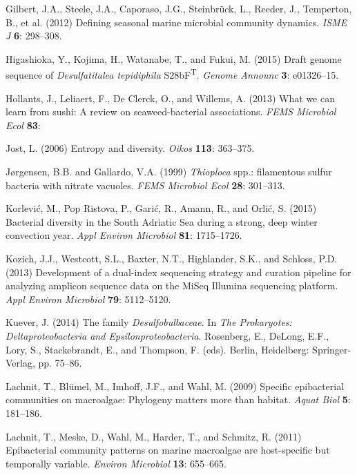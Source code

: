 \documentclass[12pt,]{article}
\begin{document}
\leavevmode\hypertarget{ref-Gilbert2012}{}%
Gilbert, J.A., Steele, J.A., Caporaso, J.G., Steinbrück, L., Reeder, J.,
Temperton, B., et al. (2012) Defining seasonal marine microbial
community dynamics. \emph{ISME J} \textbf{6}: 298--308.

\leavevmode\hypertarget{ref-Higashioka2015}{}%
Higashioka, Y., Kojima, H., Watanabe, T., and Fukui, M. (2015) Draft
genome sequence of \emph{Desulfatitalea tepidiphila}
S28bF\textsuperscript{T}. \emph{Genome Announc} \textbf{3}: e01326--15.

\leavevmode\hypertarget{ref-Hollants2013}{}%
Hollants, J., Leliaert, F., De Clerck, O., and Willems, A. (2013) What
we can learn from sushi: A review on seaweed-bacterial associations.
\emph{FEMS Microbiol Ecol} \textbf{83}:

\leavevmode\hypertarget{ref-Jost2006}{}%
Jost, L. (2006) Entropy and diversity. \emph{Oikos} \textbf{113}:
363--375.

\leavevmode\hypertarget{ref-Jorgensen1999}{}%
Jørgensen, B.B. and Gallardo, V.A. (1999) \emph{Thioploca} spp.:
filamentous sulfur bacteria with nitrate vacuoles. \emph{FEMS Microbiol
Ecol} \textbf{28}: 301--313.

\leavevmode\hypertarget{ref-Korlevic2015}{}%
Korlević, M., Pop Ristova, P., Garić, R., Amann, R., and Orlić, S.
(2015) Bacterial diversity in the South Adriatic Sea during a strong,
deep winter convection year. \emph{Appl Environ Microbiol} \textbf{81}:
1715--1726.

\leavevmode\hypertarget{ref-Kozich2013}{}%
Kozich, J.J., Westcott, S.L., Baxter, N.T., Highlander, S.K., and
Schloss, P.D. (2013) Development of a dual-index sequencing strategy and
curation pipeline for analyzing amplicon sequence data on the MiSeq
Illumina sequencing platform. \emph{Appl Environ Microbiol} \textbf{79}:
5112--5120.

\leavevmode\hypertarget{ref-Kuever2014}{}%
Kuever, J. (2014) The family \emph{Desulfobulbaceae}. In \emph{The
Prokaryotes: Deltaproteobacteria and Epsilonproteobacteria}. Rosenberg,
E., DeLong, E.F., Lory, S., Stackebrandt, E., and Thompson, F. (eds).
Berlin, Heidelberg: Springer-Verlag, pp. 75--86.

\leavevmode\hypertarget{ref-Lachnit2009}{}%
Lachnit, T., Blümel, M., Imhoff, J.F., and Wahl, M. (2009) Specific
epibacterial communities on macroalgae: Phylogeny matters more than
habitat. \emph{Aquat Biol} \textbf{5}: 181--186.

\leavevmode\hypertarget{ref-Lachnit2011}{}%
Lachnit, T., Meske, D., Wahl, M., Harder, T., and Schmitz, R. (2011)
Epibacterial community patterns on marine macroalgae are host-specific
but temporally variable. \emph{Environ Microbiol} \textbf{13}: 655--665.
\end{document}
